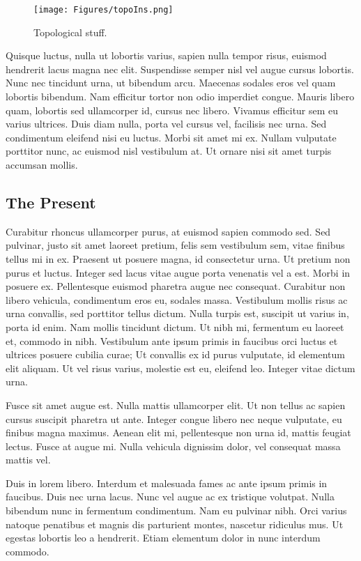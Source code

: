     \begin{figure}
        \centering
        \texttt{[image: Figures/topoIns.png]}
        \caption{Topological stuff. }
        \label{fig:topoIns}
    \end{figure}

Quisque luctus, nulla ut lobortis varius, sapien nulla tempor risus, euismod hendrerit lacus magna nec elit. Suspendisse semper nisl vel augue cursus lobortis. Nunc nec tincidunt urna, ut bibendum arcu. Maecenas sodales eros vel quam lobortis bibendum. Nam efficitur tortor non odio imperdiet congue. Mauris libero quam, lobortis sed ullamcorper id, cursus nec libero. Vivamus efficitur sem eu varius ultrices. Duis diam nulla, porta vel cursus vel, facilisis nec urna. Sed condimentum eleifend nisi eu luctus. Morbi sit amet mi ex. Nullam vulputate porttitor nunc, ac euismod nisl vestibulum at. Ut ornare nisi sit amet turpis accumsan mollis.

\subsection{The Present}

Curabitur rhoncus ullamcorper purus, at euismod sapien commodo sed. Sed pulvinar, justo sit amet laoreet pretium, felis sem vestibulum sem, vitae finibus tellus mi in ex. Praesent ut posuere magna, id consectetur urna. Ut pretium non purus et luctus. Integer sed lacus vitae augue porta venenatis vel a est. Morbi in posuere ex. Pellentesque euismod pharetra augue nec consequat. Curabitur non libero vehicula, condimentum eros eu, sodales massa. Vestibulum mollis risus ac urna convallis, sed porttitor tellus dictum. Nulla turpis est, suscipit ut varius in, porta id enim. Nam mollis tincidunt dictum. Ut nibh mi, fermentum eu laoreet et, commodo in nibh. Vestibulum ante ipsum primis in faucibus orci luctus et ultrices posuere cubilia curae; Ut convallis ex id purus vulputate, id elementum elit aliquam. Ut vel risus varius, molestie est eu, eleifend leo. Integer vitae dictum urna.

Fusce sit amet augue est. Nulla mattis ullamcorper elit. Ut non tellus ac sapien cursus suscipit pharetra ut ante. Integer congue libero nec neque vulputate, eu finibus magna maximus. Aenean elit mi, pellentesque non urna id, mattis feugiat lectus. Fusce at augue mi. Nulla vehicula dignissim dolor, vel consequat massa mattis vel.

Duis in lorem libero. Interdum et malesuada fames ac ante ipsum primis in faucibus. Duis nec urna lacus. Nunc vel augue ac ex tristique volutpat. Nulla bibendum nunc in fermentum condimentum. Nam eu pulvinar nibh. Orci varius natoque penatibus et magnis dis parturient montes, nascetur ridiculus mus. Ut egestas lobortis leo a hendrerit. Etiam elementum dolor in nunc interdum commodo.


